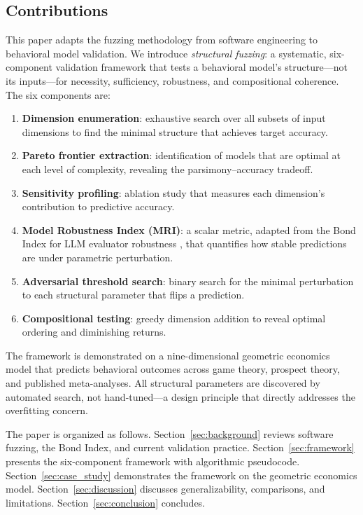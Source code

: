 \documentclass[12pt]{article}
\begin{document}
\subsection{Contributions}

This paper adapts the fuzzing methodology from software engineering to behavioral model validation.  We introduce \emph{structural fuzzing}: a systematic, six-component validation framework that tests a behavioral model's structure---not its inputs---for necessity, sufficiency, robustness, and compositional coherence.  The six components are:

\begin{enumerate}
    \item \textbf{Dimension enumeration}: exhaustive search over all subsets of input dimensions to find the minimal structure that achieves target accuracy.
    \item \textbf{Pareto frontier extraction}: identification of models that are optimal at each level of complexity, revealing the parsimony--accuracy tradeoff.
    \item \textbf{Sensitivity profiling}: ablation study that measures each dimension's contribution to predictive accuracy.
    \item \textbf{Model Robustness Index (MRI)}: a scalar metric, adapted from the Bond Index for LLM evaluator robustness \cite{bond2026geometric}, that quantifies how stable predictions are under parametric perturbation.
    \item \textbf{Adversarial threshold search}: binary search for the minimal perturbation to each structural parameter that flips a prediction.
    \item \textbf{Compositional testing}: greedy dimension addition to reveal optimal ordering and diminishing returns.
\end{enumerate}

The framework is demonstrated on a nine-dimensional geometric economics model \cite{bond2026geometric,bond2026gecon} that predicts behavioral outcomes across game theory, prospect theory, and published meta-analyses.  All structural parameters are discovered by automated search, not hand-tuned---a design principle that directly addresses the overfitting concern.

The paper is organized as follows.  Section~\ref{sec:background} reviews software fuzzing, the Bond Index, and current validation practice.  Section~\ref{sec:framework} presents the six-component framework with algorithmic pseudocode.  Section~\ref{sec:case_study} demonstrates the framework on the geometric economics model.  Section~\ref{sec:discussion} discusses generalizability, comparisons, and limitations.  Section~\ref{sec:conclusion} concludes.
\end{document}
